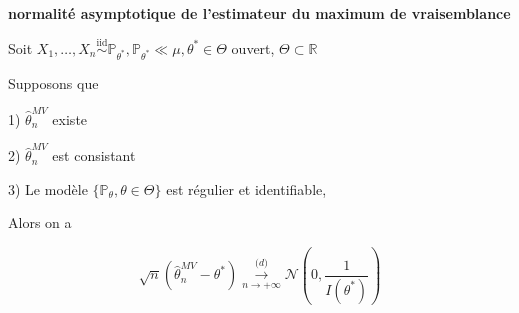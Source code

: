 \documentclass[12pt]{article}
\newif\ifcorrection
\newcommand{\corr}[1]{\ifcorrection{\color{lightblue}#1\color{black}}\fi}
\newcommand{\espace}{\vspace{1.5em}}
\newcommand{\petitespace}{\vspace{0.5cm}}
\newcommand{\shift}{\hspace{2em}}
\newcommand{\bb}[1]{\mathbb{#1}} %
\newcommand{\R}{\bb{R}} %
\renewcommand{\P}{\bb{P}}%
\newcommand{\somme}[2]{\sum\limits_{#1}^{#2}}
\renewcommand{\cal}{\mathcal}
\newcommand{\Min}[1]{\min\limits_{#1}}
\newcommand{\normale}[2]{\mathcal{N}(#1,#2)} %
\newcommand{\Xunan}{X_1,\ldots,X_n} %
\newcommand{\modelstat}{\{ \P_\theta, \theta \in \Theta\}}
\newcommand{\EMV}{\widehat{\theta}_n^{MV}}
\newcommand{\esptheta}[1]{\bb{E}_\theta[#1]}
\newcommand{\simiid}{\overset{\text{iid}}{\sim}}
\newcommand{\1}{\bb{1}} %
\newcommand{\cvn}{\underset{n\rightarrow+\infty}{\longrightarrow}} %
\newcommand{\cvps}{\overset{\text{p.s.}}{\cvn}} %
\newcommand{\cvP}{\overset{P}{\cvn}} %
\newcommand{\cvl}{\overset{\mathcal (d)}{\cvn}} %
\begin{document}
\textbf{normalité asymptotique de l'estimateur du maximum de vraisemblance}\vspace{1em}

Soit $\Xunan \simiid \P_{\theta^*}, \P_{\theta^*}\ll \mu, \theta^*\in \Theta$ ouvert, $\Theta \subset \R$


Supposons que \espace

\shift 1) $\EMV$ existe \espace

\shift 2) $\EMV$ est consistant\espace

\shift 3) Le modèle $\modelstat$ est régulier et identifiable, \espace


Alors on a 

$$\sqrt n (\EMV-\theta^*) \cvl \normale{0}{\frac 1{I(\theta^*)}}$$
\petitespace

\corr{\textbf{Preuve :}

Comme $\Theta$ est un ouvert, et $l(x, \theta)$ est  $\cal C^1$ en $\theta$, on a 

$$\EMV \in \arg \Min{\theta \in \Theta}l_n(\theta) \implies l'_n(\EMV)=0$$


On sait par TAF, comme $l_n(x, \theta) \in \cal C^2(\Theta)$ pour $\mu$ presque tout $x$, qu'il existe $\widetilde \theta_n \in [\theta^*, \EMV]$ tel que 

$$l'_n(\EMV)-l'_n(\theta^*)=l''_n(\widetilde \theta_n)(\EMV-\theta^*)$$ 

Donc 

$$\sqrt n(\EMV-\theta^*)=\sqrt n \frac{-l'(\theta^*)}{l''(\widetilde\theta_n)}$$

Or on a 

$$-\sqrt n l'_n(\theta^*)=\sqrt n (\frac 1n\somme{i=1}{n}log(f(X_i, \theta^*))')=\sqrt n (\frac 1n\somme{i=1}{n}s(X_i, \theta^*)-\esptheta{s(X_1, \theta)})\cvl \normale{0}{\bb{V}_\theta(s(X_1, \theta^*))}$$

Par TCL en en utilisant le fait que $\esptheta{s(X_1, \theta)}=0$ par régularité de $\modelstat$

Donc on a 

$$-\sqrt n l'_n(\theta^*) \cvl \normale{0}{I(\theta^*)}$$

on a aussi que $l''_n(\widetilde \theta_n)=l''_n(\theta^*)+l''_n(\widetilde \theta_n)-l''_n(\theta^*)$ \espace

or $l''_n(\theta^*)=\frac 1n \somme{i=1}{n}l''(X_i, \theta^*) \cvps \esptheta{l''(\theta^*)}=-I(\theta^*)$ par la loi forte des grands nombres\espace

On a aussi que $l''_n(\widetilde \theta_n)-l''_n(\theta^*) \cvP 0$ donc,  par slutsky, on a 

$$\sqrt n(\EMV-\theta^*)=\sqrt n \frac{l'(\theta^*)}{l''(\widetilde\theta_n)}\cvl \normale{0}{\frac{1}{I(\theta^*)}}$$
}
\end{document}
